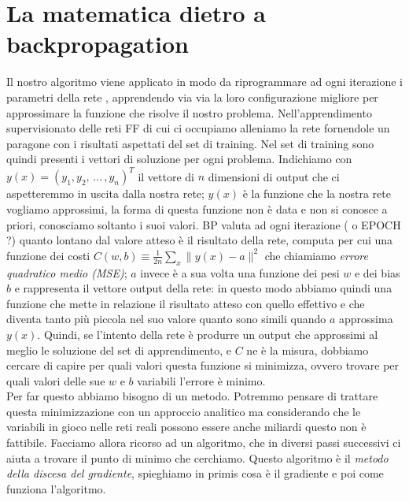 \section*{La matematica dietro a backpropagation}
Il nostro algoritmo viene applicato in modo da riprogrammare ad ogni iterazione i parametri della rete , apprendendo via via la loro configurazione migliore per approssimare la funzione che risolve il nostro problema. Nell'apprendimento supervisionato delle reti FF di cui ci occupiamo alleniamo la rete fornendole un paragone con i risultati aspettati del set di training. Nel set di training sono quindi presenti i vettori di soluzione per ogni problema. Indichiamo con $ y(x)=(y_{1}, y_{2},\, \dots \, , y_{n})^{T} $ il vettore di $n$ dimensioni di output che ci aspetteremmo in uscita dalla  nostra rete; $y(x)$ è la funzione che la nostra rete vogliamo approssimi, la forma di questa funzione non è data e non si conosce a priori, conosciamo soltanto i suoi valori. BP valuta ad ogni iterazione ( o EPOCH ?) quanto lontano dal valore atteso è il risultato della rete, computa per cui una funzione dei costi $\displaystyle C(w,b)\equiv\frac{1}{2n}\sum_{x} \parallel y(x)-a\parallel^{2}$ che chiamiamo \textit{errore quadratico medio (MSE)}; $a$ invece è a sua volta una funzione dei pesi $w$ e dei bias $b$ e rappresenta il vettore output della rete: in questo modo abbiamo quindi una funzione che mette in relazione il risultato atteso con quello effettivo e che diventa tanto più piccola nel suo valore quanto sono simili quando $a$ approssima $y(x)$. Quindi, se l'intento della rete è produrre un output che approssimi al meglio le soluzione del set di apprendimento, e $C$ ne è la misura, dobbiamo cercare di capire per quali valori questa funzione si minimizza, ovvero trovare per quali valori delle sue $w$ e $b$ variabili l'errore è minimo. 
\\
Per far questo abbiamo bisogno di un metodo. Potremmo pensare di trattare questa minimizzazione con un approccio analitico ma considerando che le variabili in gioco nelle reti reali possono essere anche miliardi questo non è fattibile. 
Facciamo allora ricorso ad un algoritmo, che in diversi passi successivi ci aiuta a trovare il punto di minimo che cerchiamo. Questo algoritmo è il \textit{metodo della discesa del gradiente}, spieghiamo in primis cosa è il gradiente e poi come funziona l'algoritmo.
